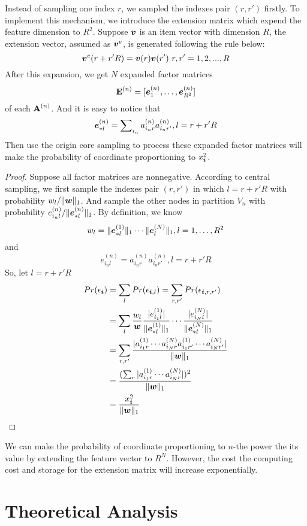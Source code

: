 \documentclass[letterpaper]{article}
\newcommand{\Sca}[3]{{#1}^{(#2)}_{i_#2#3}}%
\newcommand{\V}[1]{{\bm{{\MakeLowercase{#1}}}}}
\newcommand{\VnC}[3]{\V{#1}^{(#2)}_{#3}}
\newcommand{\M}[1]{{\bm{\mathbf{\MakeUppercase{#1}}}}}
\newcommand{\norm}[2]{\|#1\|_{#2}}
\begin{document}
Instead of sampling one index $r$, we sampled the indexes pair $(r,r')$ firstly.
To implement this mechanism,
we introduce the extension matrix which expend the feature dimension to $R^2$.
Suppose $\V{v}$ is an item vector with dimension $R$,
the extension vector, assumed as $\V{v}^e$,
is generated following the rule below:
\[
    \V{v}^e(r+r'R) = \V{v}(r)\V{v}(r')\ r,r' = {1,2,...,R}
\]
After this expansion, we get $N$ expanded factor matrices
\[
    \M{E}^{(n)}=[\VnC{e}{n}{1},\ldots,\VnC{e}{n}{R^2}]
\]
of each $\M{A}^{(n)}$. 
And it is easy to notice that
\[
    \VnC{e}{n}{*l} = \sum\nolimits_{i_n}\Sca{a}{n}{r}\Sca{a}{n}{r'},l=r+r'R
\]
Then use the origin core sampling to process these expanded factor matrices will make the probability of coordinate proportioning to $x_{\V{i}}^2$.
\begin{proof}
Suppose all factor matrices are nonnegative. According to central sampling, we first sample the indexes pair $(r,r')$ in which $l = r+r'R$ with probability $w_l/\norm{\V{w}}{1}$. And sample the other nodes in partition $V_n$ with probability $e^{(n)}_{i_nl}/\norm{\VnC{e}{n}{*l}}{1}$. By definition, we know
\[
w_l = \norm{\VnC{e}{1}{*l}}{1}\cdots \norm{\VnC{e}{N}{l}}{1}, l = 1,\ldots,R^2
\]
and
\[
e^{(n)}_{i_nl} = \Sca{a}{n}{r}\Sca{a}{n}{r'}, l = r+r'R
\]
So, let $l = r+r'R$
\begin{align*}
Pr(\epsilon_{\V{i}}) &= \sum_{l} Pr(\epsilon_{\V{i},l})= \sum_{r,r'} Pr(\epsilon_{\V{i},r,r'})\\
&= \sum_{l} \frac{w_l}{\V{w}}
\frac{|e^{(1)}_{i_1l}|}{\norm{\VnC{e}{1}{*l}}{1}}\cdots
\frac{|e^{(N)}_{i_Nl}|}{\norm{\VnC{e}{N}{*l}}{1}}\\
& = \sum_{r,r'} \frac{|\Sca{a}{1}{r}\cdots\Sca{a}{N}{r}\Sca{a}{1}{r'}\cdots\Sca{a}{N}{r'}|}
{\norm{\V{W}}{1}}\\
& = \frac{(\sum_{r}|\Sca{a}{1}{r}\cdots\Sca{a}{N}{r}|)^2}{\norm{\V{W}}{1}}\\
& = \frac{x_{\V{i}}^2}{\norm{\V{w}}{1}}
\end{align*}
\end{proof}


We can make the probability of coordinate proportioning to $n$-the power the its value by extending the feature vector to $R^N$. However, the cost the computing cost and storage for the extension matrix will increase exponentially.

\section{Theoretical Analysis}
\end{document}
